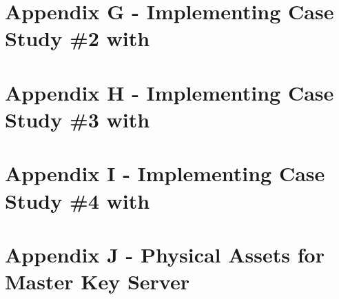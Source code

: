 \begin{appendices}


\section{Appendix G - Implementing Case Study \#2 with \thePolicyLang}
\label{appendix:case_study_2_policy}



\section{Appendix H - Implementing Case Study \#3 with \thePolicyLang}
\label{appendix:case_study_3_policy}



\section{Appendix I - Implementing Case Study \#4 with \thePolicyLang}
\label{appendix:case_study_4_policy}



\section{Appendix J - Physical Assets for Master Key Server}
\label{appendix:mks_assets}


\end{appendices}
